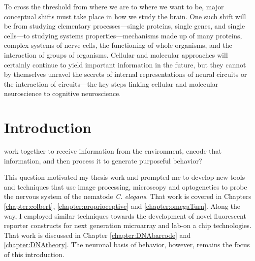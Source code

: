 \begin{savequote}[75mm] 
To cross the threshold from where we are to where we want to be, major conceptual shifts must take place in how we study the brain. One such shift will be from studying elementary processes---single proteins, single genes, and single cells---to studying systems properties---mechanisms made up of many proteins, complex systems of nerve cells, the functioning of whole organisms, and the interaction of groups of organisms. Cellular and molecular approaches will certainly continue to yield important information in the future, but they cannot by themselves unravel the secrets of internal representations of neural circuits or the interaction of circuits---the key steps linking cellular and molecular neuroscience to cognitive neuroscience. 
\end{savequote}



\chapter{Introduction}

 work together to receive information from the environment, encode that information, and then process it to generate  purposeful behavior?  









This question motivated my thesis work and prompted me to develop new tools and techniques that use image processing, microscopy and optogenetics to probe the nervous system of the nematode \emph{C. elegans}. That work is covered in Chapters \ref{chapter:colbert}, \ref{chapter:proprioceptive} and  \ref{chapter:omegaTurn}. Along the way, I employed similar techniques  towards the development of  novel fluorescent reporter constructs for next generation microarray and lab-on a chip technologies. That work is discussed in Chapter \ref{chapter:DNAbarcode} and \ref{chapter:DNAtheory}. The neuronal basis of behavior, however, remains the focus of this introduction.



